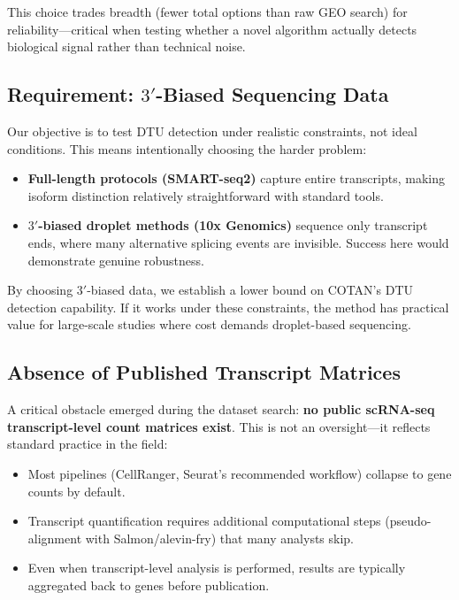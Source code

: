 This choice trades breadth (fewer total options than raw GEO search) for reliability---critical when testing whether a novel algorithm actually detects biological signal rather than technical noise.

\subsection*{Requirement: $3'$-Biased Sequencing Data}

Our objective is to test DTU detection under realistic constraints, not ideal conditions. This means intentionally choosing the harder problem:
\begin{itemize}
    \item \textbf{Full-length protocols (SMART-seq2)} capture entire transcripts, making isoform distinction relatively straightforward with standard tools.
    \item \textbf{$3'$-biased droplet methods (10x Genomics)} sequence only transcript ends, where many alternative splicing events are invisible. Success here would demonstrate genuine robustness.
\end{itemize}

By choosing $3'$-biased data, we establish a lower bound on COTAN's DTU detection capability. If it works under these constraints, the method has practical value for large-scale studies where cost demands droplet-based sequencing.

\subsection*{Absence of Published Transcript Matrices}

A critical obstacle emerged during the dataset search: \textbf{no public scRNA-seq transcript-level count matrices exist}. This is not an oversight---it reflects standard practice in the field:
\begin{itemize}
    \item Most pipelines (CellRanger, Seurat's recommended workflow) collapse to gene counts by default.
    \item Transcript quantification requires additional computational steps (pseudo-alignment with Salmon/alevin-fry) that many analysts skip.
    \item Even when transcript-level analysis is performed, results are typically aggregated back to genes before publication.
\end{itemize}

